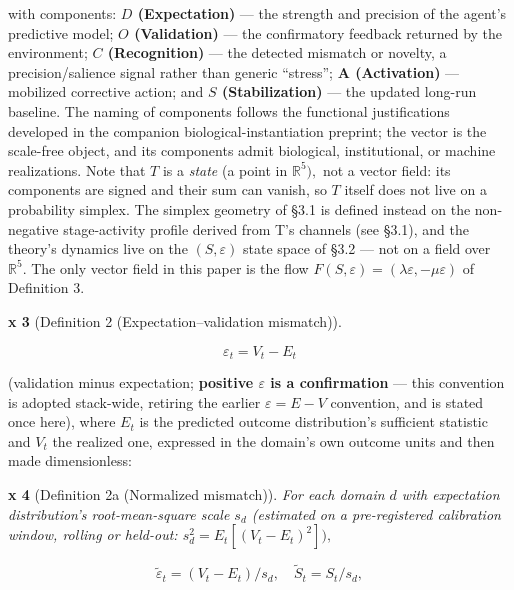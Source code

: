 \documentclass[
]{article}
\begin{document}
with components: \textbf{\(D\) (Expectation)} --- the strength and
precision of the agent's predictive model; \textbf{\(O\) (Validation)}
--- the confirmatory feedback returned by the environment; \textbf{\(C\)
(Recognition)} --- the detected mismatch or novelty, a
precision/salience signal rather than generic ``stress''; \textbf{A
(Activation)} --- mobilized corrective action; and \textbf{\(S\)
(Stabilization)} --- the updated long-run baseline. The naming of
components follows the functional justifications developed in the
companion biological-instantiation preprint; the vector is the
scale-free object, and its components admit biological, institutional,
or machine realizations. Note that \(T\) is a \emph{state} (a point in
\(\mathbb{R}^{5}),\) not a vector field: its components are signed and
their sum can vanish, so \(T\) itself does not live on a probability
simplex. The simplex geometry of §3.1 is defined instead on the
non-negative stage-activity profile derived from T's channels (see
§3.1), and the theory's dynamics live on the \((S, \varepsilon)\) state
space of §3.2 --- not on a field over \(\mathbb{R}^{5}.\) The only
vector field in this paper is the flow
\(F(S, \varepsilon) = (\lambda\varepsilon, -\mu\varepsilon)\) of
Definition 3.

\textbf{x 3} (Definition 2 (Expectation--validation mismatch)).

\begin{equation}
\varepsilon_t = V_t - E_t
\label{eq:mismatch}
\end{equation}

(validation minus expectation; \textbf{positive \(\varepsilon\) is a
confirmation} --- this convention is adopted stack-wide, retiring the
earlier \(\varepsilon = E - V\) convention, and is stated once here),
where \(E_t\) is the predicted outcome distribution's sufficient
statistic and \(V_t\) the realized one, expressed in the domain's own
outcome units and then made dimensionless:

\textbf{x 4} (Definition 2a (Normalized mismatch)). \emph{For each
domain \(d\) with expectation distribution's root-mean-square scale
\(s_d\) (estimated on a pre-registered calibration window, rolling or
held-out: \(s_d^{2} = E_t[(V_t - E_t)^{2}]),\)}

\begin{equation}
\tilde{\varepsilon}_t = (V_t - E_t) / s_d, \quad \tilde{S}_t = S_t / s_d,
\label{eq:norm}
\end{equation}
\end{document}
